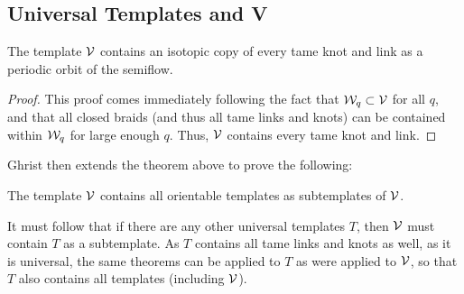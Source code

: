 \documentclass[paper.tex]{subfiles}
\begin{document}
\subsection{Universal Templates and V}

\begin{thm}[Ghrist 1995]
    The template $\mathcal{V}$ contains an isotopic copy of every tame knot and link as a periodic orbit of the semiflow. 
\end{thm}
\begin{proof}
    This proof comes immediately following the fact that $\mathcal{W}_q \subset \mathcal{V}$ for all $q$, and that all closed braids (and thus all tame links and knots) can be contained within $\mathcal{W}_q$ for large enough $q$. Thus, $\mathcal{V}$ contains every tame knot and link. 
\end{proof}


Ghrist then extends the theorem above to prove the following: 

\begin{thm}[Ghrist 1995] 
    The template $\mathcal{V}$ contains all orientable templates as subtemplates of $\mathcal{V}$. 
\end{thm}

It must follow that if there are any other universal templates $T$, then $\mathcal{V}$ must contain $T$ as a subtemplate. As $T$ contains all tame links and knots as well, as it is universal, the same theorems can be applied to $T$ as were applied to $\mathcal{V}$, so that $T$ also contains all templates (including $\mathcal{V}$). 
\end{document}
